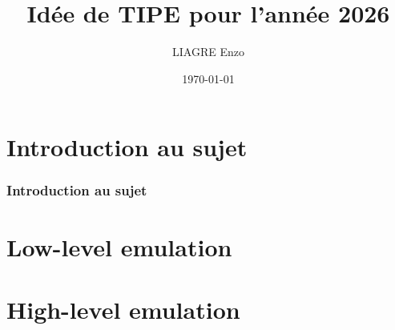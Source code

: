\documentclass{beamer}
\title{Idée de TIPE pour l'année 2026}
\author{LIAGRE Enzo}
\date{\today}
\begin{document}
    
    \frame{\titlepage}

    \begin{frame}
        \tableofcontents
    \end{frame}

    \section{Introduction au sujet}
    \begin{frame}
        \frametitle{Introduction au sujet}
    \end{frame}

    \section{Low-level emulation}    
    \begin{frame}
    \end{frame}

    \section{High-level emulation}
    \begin{frame}    
    \end{frame}
    
\end{document}
